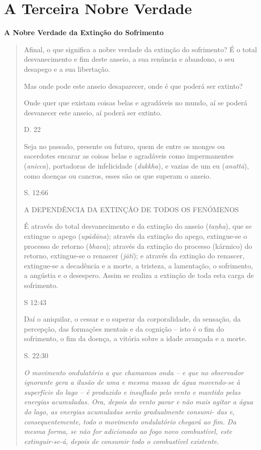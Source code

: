 \chapter{A Terceira Nobre Verdade}

\textbf{A Nobre Verdade da Extinção do Sofrimento}

\begin{quote}
Afinal, o que significa a nobre verdade da extinção do sofrimento? É o total desvanecimento e fim deste anseio, a sua renúncia e abandono, o seu desapego e a sua libertação.

Mas onde pode este anseio desaparecer, onde é que poderá ser extinto?

Onde quer que existam coisas belas e agradáveis no mundo, aí se poderá desvanecer este anseio, aí poderá ser extinto.

D. 22

Seja no passado, presente ou futuro, quem de entre os monges ou sacerdotes encarar as coisas belas e agradáveis como impermanentes (\emph{anicca}), portadoras de infelicidade (\emph{dukkha}), e vazias de um eu (\emph{anattā}), como doenças ou cancros, esses são os que superam o anseio.

S. 12:66

A DEPENDÊNCIA DA EXTINÇÃO DE TODOS OS FENÓMENOS

É através do total desvanecimento e da extinção do anseio (\emph{taṇha}), que se extingue o apego (\emph{upādāna}); através da extinção do apego, extingue-se o processo de retorno (\emph{bhava}); através da extinção do processo (kármico) do retorno, extingue-se o renascer (\emph{jāti}); e através da extinção do renascer, extingue-se a decadência e a morte, a tristeza, a lamentação, o sofrimento, a angústia e o desespero. Assim se realiza a extinção de toda esta carga de sofrimento.

S 12:43

Daí o aniquilar, o cessar e o superar da corporalidade, da sensação, da percepção, das formações mentais e da cognição -- isto é o fim do sofrimento, o fim da doença, a vitória sobre a idade avançada e a morte.

S. 22:30

\emph{O movimento ondulatório a que chamamos onda -- e que no observador ignorante gera a ilusão de uma e mesma massa de água movendo-se à superfície do lago -- é produzido e insuflado pelo vento e mantido pelas energias acumuladas. Ora, depois do vento parar e não mais agitar a água do lago, as energias acumuladas serão gradualmente consumi- das e, consequentemente, todo o movimento ondulatório chegará ao fim. Da mesma forma, se não for adicionado ao fogo novo combustível, este extinguir-se-á, depois de consumir todo o combustível existente.}


\end{quote}
